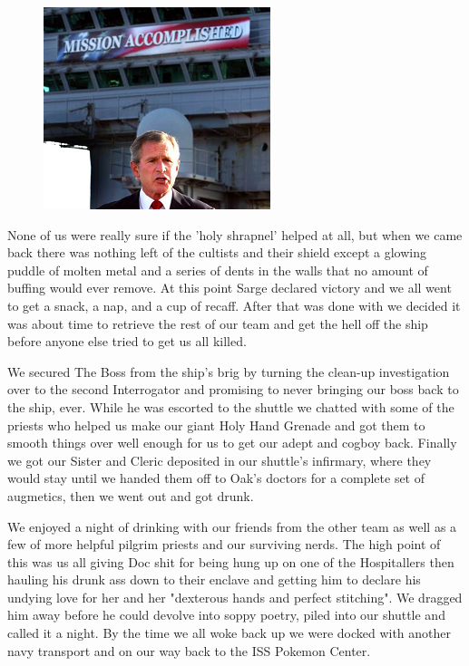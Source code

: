 \begin{figure}
	\begin{center}
		\includegraphics[width=\figwidth]{pics/2/17.png}
	\end{center}
\end{figure}
None of us were really sure if the 'holy shrapnel' helped at all, but when we came back there was nothing left of the cultists and their shield except a glowing puddle of molten metal and a series of dents in the walls that no amount of buffing would ever remove. 
At this point Sarge declared victory and we all went to get a snack, a nap, and a cup of recaff. 
After that was done with we decided it was about time to retrieve the rest of our team and get the hell off the ship before anyone else tried to get us all killed.

We secured The Boss from the ship's brig by turning the clean-up investigation over to the second Interrogator and promising to never bringing our boss back to the ship, ever. 
While he was escorted to the shuttle we chatted with some of the priests who helped us make our giant Holy Hand Grenade and got them to smooth things over well enough for us to get our adept and cogboy back. 
Finally we got our Sister and Cleric deposited in our shuttle's infirmary, where they would stay until we handed them off to Oak's doctors for a complete set of augmetics, then we went out and got drunk.

We enjoyed a night of drinking with our friends from the other team as well as a few of more helpful pilgrim priests and our surviving nerds. 
The high point of this was us all giving Doc shit for being hung up on one of the Hospitallers then hauling his drunk ass down to their enclave and getting him to declare his undying love for her and her "dexterous hands and perfect stitching". 
We dragged him away before he could devolve into soppy poetry, piled into our shuttle and called it a night. 
By the time we all woke back up we were docked with another navy transport and on our way back to the ISS Pokemon Center.


